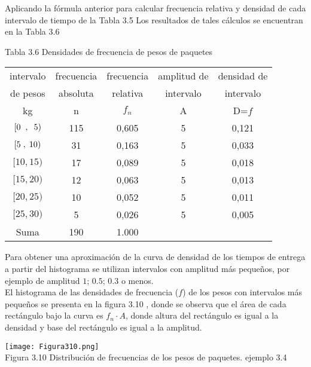 \documentclass[base=hide,12pt]{elegantbook}
\begin{document}
Aplicando la fórmula anterior para calcular frecuencia relativa y densidad de cada intervalo de tiempo de la Tabla 3.5  Los resultados de tales cálculos se encuentran en la Tabla 3.6 \\
%	
\begin{center}
Tabla 3.6 Densidades de frecuencia de pesos de paquetes\\
{\footnotesize 
		\begin{tabular}{ccccc}\hline
			intervalo	& frecuencia& frecuencia& amplitud de  & densidad de \\
			de pesos    & absoluta&	  relativa  & intervalo    & intervalo	\\
			kg   	    & n       &	$f_n$       & A            & D=$f$   	\\
			\hline
			$[0\hspace{.2cm},\hspace{.2cm}5)$	    & 115 	 & 0,605 & 5 	  & 0,121	\\ %
			$[5\hspace{.1cm},\hspace{.1cm}10)$	& 31	 & 0,163 & 5 	  & 0,033	\\ %
			$[10,15)$	& 17	 & 0,089 & 5 	  & 0,018 \\ %
			$[15,20)$	& 12	 & 0,063 & 5 	  & 0,013 \\ %
			$[20,25)$	& 10	 & 0,052 & 5 	  & 0,011 \\ %
			$[25,30)$	& 5	     & 0,026 & 5 	  & 0,005 \\ \hline
			Suma	    & 190	 & 1.000	       &      &              \\ 
			\hline
		\end{tabular}
	}
	\end{center}
\vspace{.5cm}

Para obtener una aproximación de la curva de densidad de los tiempos de entrega a partir del histograma se utilizan intervalos con amplitud más pequeños, por ejemplo de amplitud $1$; $0.5$; $0.3$ o menos.\\
	
El histograma de las densidades de frecuencia ($f$) de los pesos con intervalos más pequeños se presenta en la figura 3.10 , donde se observa que el área de cada rectángulo bajo la curva es $f_n \cdot A$, donde altura del rectángulo es igual a la densidad y  base del rectángulo es igual a la amplitud. \\
%	
\begin{center}
		\texttt{[image: Figura310.png]} \\
Figura 3.10 Distribución de frecuencias de los pesos de paquetes. ejemplo 3.4
\end{center}
	
\end{document}
